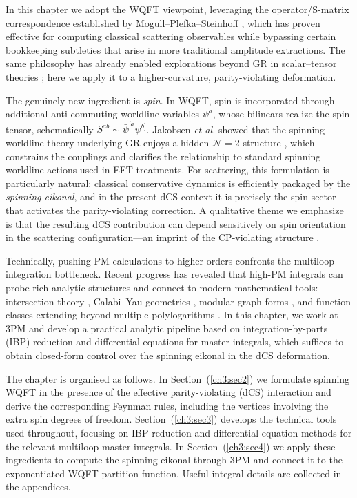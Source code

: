 In this chapter we adopt the WQFT viewpoint, leveraging the operator/S-matrix correspondence established by Mogull--Plefka--Steinhoff \cite{Mogull:2020sak,Jakobsen:2021lvp}, which has proven effective for computing classical scattering observables while bypassing certain bookkeeping subtleties that arise in more traditional amplitude extractions. The same philosophy has already enabled explorations beyond GR in scalar--tensor theories \cite{Bhattacharyya:2023kbh}; here we apply it to a higher-curvature, parity-violating deformation.

The genuinely new ingredient is \emph{spin}. In WQFT, spin is incorporated through additional anti-commuting worldline variables $\psi^{a}$, whose bilinears realize the spin tensor, schematically $S^{ab}\sim\bar\psi^{[a}\psi^{b]}$. Jakobsen \emph{et al.} showed that the spinning worldline theory underlying GR enjoys a hidden $\mathcal N=2$ structure \cite{Jakobsen:2021lvp,Jakobsen:2021zvh}, which constrains the couplings and clarifies the relationship to standard spinning worldline actions used in EFT treatments. For scattering, this formulation is particularly natural: classical conservative dynamics is efficiently packaged by the \emph{spinning eikonal}, and in the present dCS context it is precisely the spin sector that activates the parity-violating correction. A qualitative theme we emphasize is that the resulting dCS contribution can depend sensitively on spin orientation in the scattering configuration—an imprint of the CP-violating structure \cite{Yunes:2009hc}.

Technically, pushing PM calculations to higher orders confronts the multiloop integration bottleneck. Recent progress has revealed that high-PM integrals can probe rich analytic structures and connect to modern mathematical tools: intersection theory \cite{Mastrolia:2018uzb,Brunello:2023rpq,Brunello:2023fef}, Calabi--Yau geometries \cite{Frellesvig:2023bbf,Klemm:2024wtd}, modular graph forms \cite{Dorigoni:2022npe}, and function classes extending beyond multiple polylogarithms \cite{Weinzierl:2007cx}. In this chapter, we work at 3PM and develop a practical analytic pipeline based on integration-by-parts (IBP) reduction and differential equations for master integrals, which suffices to obtain closed-form control over the spinning eikonal in the dCS deformation.

The chapter is organised as follows. In Section~(\ref{ch3:sec2}) we formulate spinning WQFT in the presence of the effective parity-violating (dCS) interaction and derive the corresponding Feynman rules, including the vertices involving the extra spin degrees of freedom. Section~(\ref{ch3:sec3}) develops the technical tools used throughout, focusing on IBP reduction and differential-equation methods for the relevant multiloop master integrals. In Section~(\ref{ch3:sec4}) we apply these ingredients to compute the spinning eikonal through 3PM and connect it to the exponentiated WQFT partition function. Useful integral details are collected in the appendices.
